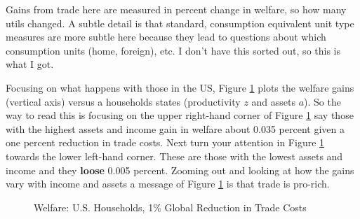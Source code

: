 \documentclass[12pt,pdftex]{article}
\begin{document}
\begin{onehalfspacing}
Gains from trade here are measured in percent change in welfare, so how many utils changed. A subtle detail is that standard, consumption equivalent unit type measures are more subtle here because they lead to questions about which consumption units (home, foreign), etc. I don't have this sorted out, so this is what I got.

Focusing on what happens with those in the US, Figure \ref{fig:welfare-elasticity} plots the welfare gains (vertical axis) versus a households states (productivity $z$ and assets $a$). So the way to read this is focusing on the upper right-hand corner of Figure \ref{fig:welfare-elasticity} say those with the highest assets and income gain in welfare about 0.035 percent given a one percent reduction in trade costs. Next turn your attention in Figure \ref{fig:welfare-elasticity} towards the lower left-hand corner. These are those with the lowest assets and income and they \textbf{loose} 0.005 percent. Zooming out and looking at how the gains vary with income and assets a message of Figure \ref{fig:welfare-elasticity} is that trade is pro-rich.

\begin{figure}[!t]
\caption{Welfare: U.S. Households, 1\% Global Reduction in Trade Costs}\label{fig:welfare-elasticity}
\end{figure}


\end{onehalfspacing}
\end{document}
